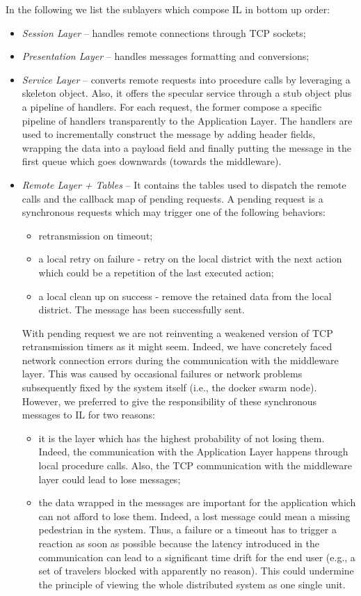 In the following we list the sublayers which compose IL in
bottom up order:

\begin{itemize}
  \item \textit{Session Layer} --
  handles remote connections through TCP sockets;
  \item \textit{Presentation Layer} --
  handles messages formatting and conversions;
  \item \textit{Service Layer} --
  converts remote requests into procedure calls
  by leveraging a skeleton object.
  Also, it offers the specular service through a stub object plus a pipeline
  of handlers. For each request, the former compose a specific pipeline
  of handlers transparently to the Application Layer.
  The handlers are used to incrementally construct the message by adding
  header fields, wrapping the data into a payload field and finally putting
  the message in the first queue which goes downwards (towards the middleware).
  \item \textit{Remote Layer + Tables} --
  It contains the tables used
  to dispatch the remote calls and the callback map of pending requests.
  A pending request is a synchronous requests which may trigger one of
  the following behaviors:
  \begin{itemize}
  	\item retransmission on timeout;
  	\item a local retry on failure - retry on the local district with
  	the next action which could be a repetition of the last executed action;
  	\item a local clean up on success - remove the retained data from the local
  	district. The message has been successfully sent.
  \end{itemize}
  With pending request we are not reinventing a weakened version
  of TCP retransmission timers as it might seem.
  Indeed, we have concretely faced network connection errors during
  the communication
  with the middleware layer. This was caused by occasional failures or network
  problems subsequently fixed by the system itself
  (i.e., the docker swarm node).
  However,
  we preferred to give the responsibility of these synchronous messages to IL
  for two reasons:
  \begin{itemize}
  	\item it is the layer which has the highest probability of not losing them.
  	Indeed, the communication with the Application Layer happens through
  	local procedure
  	calls. Also, the TCP communication with the middleware layer could lead to
  	lose messages;
  	\item the data wrapped in the messages are important for the
  	application which can not afford to lose them. Indeed, a lost message
    could mean a missing pedestrian in the system. Thus, a failure
  	or a timeout has to trigger a reaction as soon as possible because
  	the latency introduced in the communication can lead to a significant
  	time drift for the end user (e.g., a set of travelers blocked with
  	apparently no reason). This could undermine the principle of viewing the
  	whole distributed system as one single unit.
  \end{itemize}
\end{itemize}
